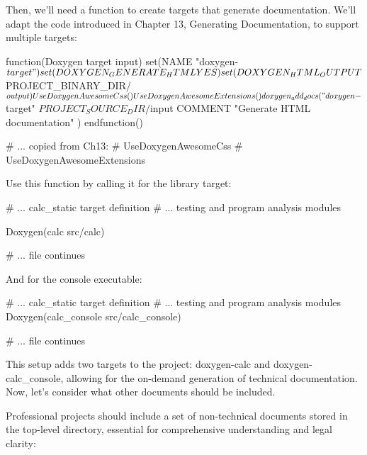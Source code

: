 Then, we’ll need a function to create targets that generate documentation. We’ll adapt the code introduced in Chapter 13, Generating Documentation, to support multiple targets:


\begin{cmake}
function(Doxygen target input)
    set(NAME "doxygen-${target}")
    set(DOXYGEN_GENERATE_HTML YES)
    set(DOXYGEN_HTML_OUTPUT ${PROJECT_BINARY_DIR}/${output})

    UseDoxygenAwesomeCss()
    UseDoxygenAwesomeExtensions()

    doxygen_add_docs("doxygen-${target}"
        ${PROJECT_SOURCE_DIR}/${input}
        COMMENT "Generate HTML documentation"
    )
endfunction()

# ... copied from Ch13:
# UseDoxygenAwesomeCss
# UseDoxygenAwesomeExtensions
\end{cmake}

Use this function by calling it for the library target:


\begin{cmake}
# ... calc_static target definition
# ... testing and program analysis modules

Doxygen(calc src/calc)

# ... file continues
\end{cmake}

And for the console executable:


\begin{cmake}
# ... calc_static target definition
# ... testing and program analysis modules
Doxygen(calc_console src/calc_console)

# ... file continues
\end{cmake}

This setup adds two targets to the project: doxygen-calc and doxygen-calc\_console, allowing for the on-demand generation of technical documentation. Now, let’s consider what other documents should be included.


Professional projects should include a set of non-technical documents stored in the top-level directory, essential for comprehensive understanding and legal clarity:


